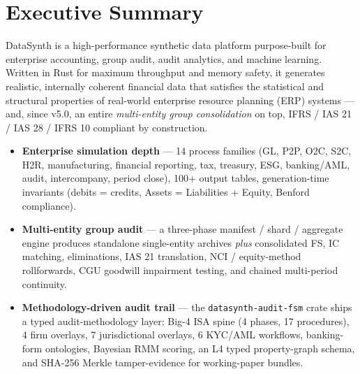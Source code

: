 \documentclass[11pt,a4paper]{article}
\begin{document}
\tableofcontents
\newpage

\section{Executive Summary}

DataSynth is a high-performance synthetic data platform purpose-built for
enterprise accounting, group audit, audit analytics, and machine learning.
Written in Rust for maximum throughput and memory safety, it generates
realistic, internally coherent financial data that satisfies the statistical
and structural properties of real-world enterprise resource planning (ERP)
systems --- and, since v5.0, an entire \emph{multi-entity group consolidation}
on top, IFRS / IAS 21 / IAS 28 / IFRS 10 compliant by construction.

\begin{tcolorbox}[keybox={Three pillars}]
\begin{itemize}[leftmargin=1.2em, itemsep=4pt]
  \item \textbf{Enterprise simulation depth} --- 14 process families (GL, P2P,
        O2C, S2C, H2R, manufacturing, financial reporting, tax, treasury,
        ESG, banking/AML, audit, intercompany, period close), 100+ output
        tables, generation-time invariants (debits = credits,
        Assets = Liabilities + Equity, Benford compliance).
  \item \textbf{Multi-entity group audit} --- a three-phase manifest /
        shard / aggregate engine produces standalone single-entity archives
        \emph{plus} consolidated FS, IC matching, eliminations, IAS 21
        translation, NCI / equity-method rollforwards, CGU goodwill
        impairment testing, and chained multi-period continuity.
  \item \textbf{Methodology-driven audit trail} --- the
        \texttt{datasynth-audit-fsm} crate ships a typed audit-methodology
        layer: Big-4 ISA spine (4 phases, 17 procedures), 4 firm overlays,
        7 jurisdictional overlays, 6 KYC/AML workflows, banking-form
        ontologies, Bayesian RMM scoring, an L4 typed property-graph
        schema, and SHA-256 Merkle tamper-evidence for working-paper
        bundles.
\end{itemize}
\end{tcolorbox}
\end{document}
